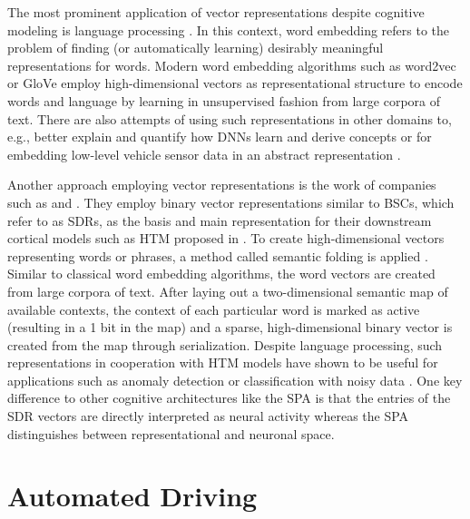 The most prominent application of vector representations despite cognitive modeling \parencite{Blouw2016, Crawford2016, Eliasmith2012} is language processing \parencite{Gayler2003}.
In this context, word embedding refers to the problem of finding (or automatically learning) desirably meaningful representations for words.
Modern word embedding algorithms such as word2vec \parencite{Mikolov2013, Mikolov2013b} or \ac{GloVe} \parencite{Pennington2014} employ high-dimensional vectors as representational structure to encode words and language by learning in unsupervised fashion from large corpora of text.
There are also attempts of using such representations in other domains to, e.g., better explain and quantify how \acp{DNN} learn and derive concepts \parencite{Fong2018} or for embedding low-level vehicle sensor data in an abstract representation \parencite{Hallac2018}.

Another approach employing vector representations is the work of companies such as \textcite{Numenta} and \textcite{Cortialio}.
They employ binary vector representations similar to \acp{BSC}, which \textcite{Ahmad2015} refer to as \acp{SDR}, as the basis and main representation for their downstream cortical models such as \ac{HTM} proposed in \textcite{Cui2017}.
To create high-dimensional vectors representing words or phrases, a method called semantic folding is applied \parencite{Webber2016}.
Similar to classical word embedding algorithms, the word vectors are created from large corpora of text.
After laying out a two-dimensional semantic map of available contexts, the context of each particular word is marked as active (resulting in a \num{1} bit in the map) and a sparse, high-dimensional binary vector is created from the map through serialization.
Despite language processing, such representations in cooperation with \ac{HTM} models have shown to be useful for applications such as anomaly detection \parencite{Ahmad2017} or classification with noisy data \parencite{Ahmad2019}. 
One key difference to other cognitive architectures like the \ac{SPA} is that the entries of the \ac{SDR} vectors are directly interpreted as neural activity whereas the \ac{SPA} distinguishes between representational and neuronal space.

\section{Automated Driving}
\label{sec:automated_driving}

